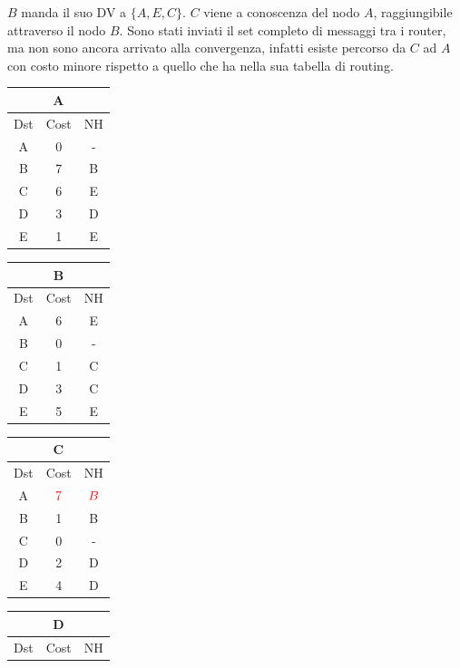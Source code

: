 \documentclass[10pt]{article}
\begin{document}
	\newline \newline
	$B$ manda il suo DV a $\{A,E,C\}$.
	\newline
	$C$ viene a conoscenza del nodo $A$, raggiungibile attraverso il nodo $B$.
	\newline
	Sono stati inviati il set completo di messaggi tra i router, ma non sono ancora arrivato alla convergenza, infatti esiste percorso da $C$ ad $A$ con costo minore rispetto a quello che ha nella sua tabella di routing.
	\begin{table}[h!]
		\begin{tabular}{|c||c||c|}
 			\hline
	 		\multicolumn{3}{|c|}{A} \\
 			\hline
 			Dst & Cost & NH\\
 			\hline
 			A & 0 & - \\
 			B & 7 & B \\
 			C & 6 & E  \\
 			D & 3 & D \\
 			E & 1 & E \\
 			\hline
		\end{tabular}
		\begin{tabular}{|c||c||c|}
 			\hline
	 		\multicolumn{3}{|c|}{B} \\
 			\hline
 			Dst & Cost & NH\\
 			\hline
 			A & 6 & E \\
 			B & 0 & - \\
 			C & 1 & C  \\
 			D & 3 & C \\
 			E & 5 & E \\
 			\hline
		\end{tabular}
		\begin{tabular}{|c||c||c|}
 			\hline
	 		\multicolumn{3}{|c|}{C} \\
 			\hline
 			Dst & Cost & NH\\
 			\hline
 			A & $\color{red} 7$ & $\color{red} B$ \\
 			B & 1 & B \\
 			C & 0 & - \\
 			D & 2 & D \\
 			E & 4 & D \\
 			\hline
		\end{tabular}
		\begin{tabular}{|c||c||c|}
 			\hline
	 		\multicolumn{3}{|c|}{D} \\
 			\hline
 			Dst & Cost & NH\\

\end{tabular}
\end{table}
\end{document}
